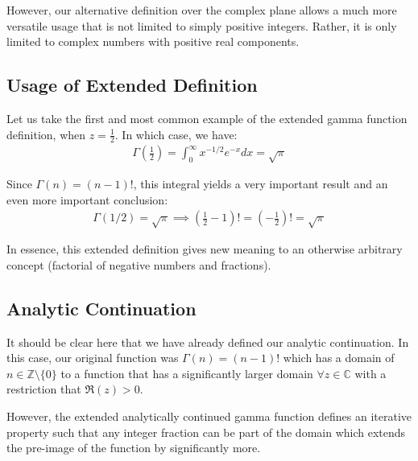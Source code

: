 \documentclass[14pt]{extarticle}
\begin{document}
However, our alternative definition over the complex plane allows a much more versatile usage that is not limited to simply positive integers.
Rather, it is only limited to complex numbers with positive real components. 

\subsection{Usage of Extended Definition}

Let us take the first and most common example of the extended gamma function definition, when $z = \frac{1}{2}$. In which case, we have:
\begin{align*}
    \Gamma\left(\frac{1}{2}\right) = \int_0^\infty x^{-1/2} e^{-x} dx  = \sqrt{\pi}
\end{align*}

Since $\Gamma(n) = (n-1)!$, this integral yields a very important result and an even more important conclusion:
\begin{align*}
    \Gamma(1/2) = \sqrt{\pi}
    \implies \left(\frac{1}{2} - 1\right)! = \left(-\frac{1}{2}\right)! = \sqrt{\pi}
\end{align*}

In essence, this extended definition gives new meaning to an otherwise arbitrary concept (factorial of negative numbers and fractions).

\subsection{Analytic Continuation}
It should be clear here that we have already defined our analytic continuation. In this case, our original function was $\Gamma(n) = 
(n-1)!$ which has a domain of $n\in \mathbb{Z} \setminus \{0\}$ to a function that has a significantly larger domain $\forall z\in
\mathbb{C}$ with a restriction that $\Re(z) > 0$.

However, the extended analytically continued gamma function defines an iterative property such that any integer fraction can be part
of the domain which extends the pre-image of the function by significantly more. 
\end{document}
